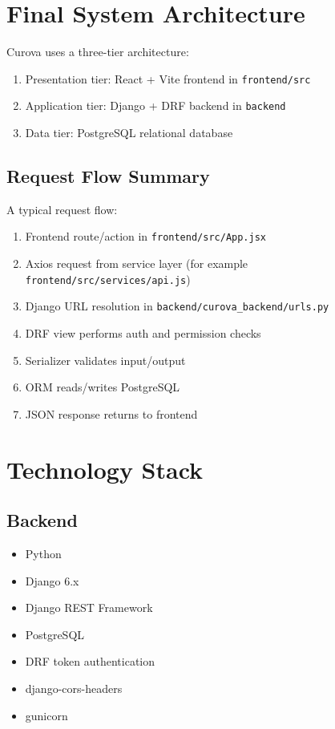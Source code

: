 \documentclass[12pt,a4paper]{article}
\begin{document}
\section{Final System Architecture}

Curova uses a three-tier architecture:
\begin{enumerate}
  \item Presentation tier: React + Vite frontend in \texttt{frontend/src}
  \item Application tier: Django + DRF backend in \texttt{backend}
  \item Data tier: PostgreSQL relational database
\end{enumerate}

\subsection{Request Flow Summary}

A typical request flow:
\begin{enumerate}
  \item Frontend route/action in \texttt{frontend/src/App.jsx}
  \item Axios request from service layer (for example \texttt{frontend/src/services/api.js})
  \item Django URL resolution in \texttt{backend/curova\_backend/urls.py}
  \item DRF view performs auth and permission checks
  \item Serializer validates input/output
  \item ORM reads/writes PostgreSQL
  \item JSON response returns to frontend
\end{enumerate}

\section{Technology Stack}

\subsection{Backend}
\begin{itemize}
  \item Python
  \item Django 6.x
  \item Django REST Framework
  \item PostgreSQL
  \item DRF token authentication
  \item django-cors-headers
  \item gunicorn
\end{itemize}
\end{document}
